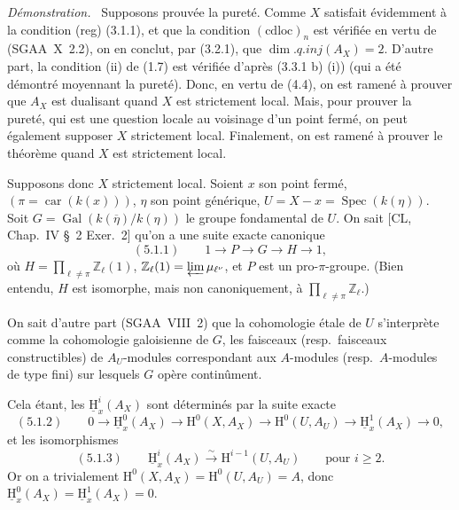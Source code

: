 \documentclass[11pt]{article}
\providecommand{\uH}{\underline{\mathrm H}}
\newenvironment{prooftext}[1][Proof]{\par\noindent\emph{#1.}\ }{\par\medskip}
\renewcommand{\H}{\mathrm{H}}
\DeclareMathOperator{\Spec}{Spec}
\newcommand{\Z}{\mathbb{Z}}
\newcommand{\car}{\operatorname{car}}
\newcommand{\ol}[1]{\overline{#1}}
\providecommand{\Gal}{\operatorname{Gal}}
\providecommand{\car}{\operatorname{car}}
\providecommand{\car}{\operatorname{car}}
\providecommand{\Z}{\mathbb Z}
\providecommand{\Spec}{\operatorname{Spec}}
\providecommand{\Spec}{\operatorname{Spec}}
\providecommand{\Spec}{\operatorname{Spec}}
\providecommand{\car}{\operatorname{car}}
\providecommand{\Spec}{\operatorname{Spec}}
\providecommand{\Gal}{\operatorname{Gal}}
\begin{document}
\begin{prooftext}[Démonstration]
Supposons prouvée la pureté. Comme $X$ satisfait évidemment à la condition (reg) (3.1.1), et que la condition $(\mathrm{cdloc})_n$ est vérifiée en vertu de (SGAA~X~2.2), on en conclut, par (3.2.1), que $\dim.q.inj(A_X)=2$. D'autre part, la condition (ii) de (1.7) est vérifiée d'après (3.3.1 b) (i)) (qui a été démontré moyennant la pureté). Donc, en vertu de (4.4), on est ramené à prouver que $A_X$ est dualisant quand $X$ est strictement local. Mais, pour prouver la pureté, qui est une question locale au voisinage d'un point fermé, on peut également supposer $X$ strictement local. Finalement, on est ramené à prouver le théorème quand $X$ est strictement local.

Supposons donc $X$ strictement local. Soient $x$ son point fermé, $(\pi=\car(k(x)))$, $\eta$ son point générique, $U=X-x=\Spec(k(\eta))$. Soit $G=\Gal(k(\ol{\eta})/k(\eta))$ le groupe fondamental de $U$. On sait [CL, Chap.~IV \S~2 Exer.~2] qu'on a une suite exacte canonique
\[
(5.1.1)\qquad 1\longrightarrow P\longrightarrow G\longrightarrow H\longrightarrow1,
\]
où $H=\prod_{\ell\ne\pi}\Z_\ell(1)$, $\Z_\ell(1)=\varprojlim \mu_{\ell^\nu}$, et $P$ est un pro-$\pi$-groupe. (Bien entendu, $H$ est isomorphe, mais non canoniquement, à $\prod_{\ell\ne\pi}\Z_\ell$.)

On sait d'autre part (SGAA~VIII~2) que la cohomologie étale de $U$ s'interprète comme la cohomologie galoisienne de $G$, les faisceaux (resp.~faisceaux constructibles) de $A_U$-modules correspondant aux $A$-modules (resp.~$A$-modules de type fini) sur lesquels $G$ opère continûment.

Cela étant, les $\uH_x^i(A_X)$ sont déterminés par la suite exacte
\[
(5.1.2)\qquad 0\longrightarrow \uH_x^0(A_X)\longrightarrow \H^0(X,A_X)\longrightarrow \H^0(U,A_U)\longrightarrow \uH_x^1(A_X)\longrightarrow0,
\]
et les isomorphismes
\[
(5.1.3)\qquad \uH_x^i(A_X)\xrightarrow{\sim}\H^{i-1}(U,A_U)\qquad\text{pour }i\geqslant2.
\]
Or on a trivialement $\H^0(X,A_X)=\H^0(U,A_U)=A$, donc $\uH_x^0(A_X)=\uH_x^1(A_X)=0$.


\end{prooftext}
\end{document}

